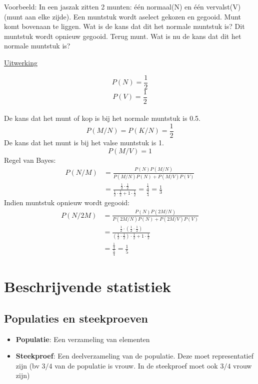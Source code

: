 \documentclass[12pt]{report}
\newcommand{\example}[2]{
      \hrulefill
      
      Voorbeeld: #1
      
      \underline{Uitwerking}
      
      #2
      
      \hrulefill
  }
\begin{document}
\example{In een jaszak zitten 2 munten: één normaal(N) en één vervalst(V) (munt aan elke zijde). Een muntstuk wordt aselect gekozen en gegooid. Munt komt bovenaan te liggen. Wat is de kans dat dit het normale muntstuk is? Dit muntstuk wordt opnieuw gegooid. Terug munt. Wat is nu de kans dat dit het normale muntstuk is?}{
	
	$$P(N) = \frac{1}{2}$$
	$$P(V) = \frac{1}{2}$$
	\\
	De kans dat het munt of kop is bij het normale muntstuk is 0.5.
	$$P(M/N) = P(K/N) = \frac{1}{2}$$
	De kans dat het munt is bij het valse muntstuk is 1.
	$$P(M/V) = 1$$
	Regel van Bayes:
	\begin{equation*}
	 \begin{split}
	  P(N/M) & = \frac{P(N)P(M/N)}{P(M/N)P(N) + P(M/V)P(V)}\\
	         & = \frac{\frac{1}{2} \cdot \frac{1}{2}}{\frac{1}{2} \cdot \frac{1}{2} + 1\cdot \frac{1}{2}}
	          = \frac{\frac{1}{4}}{\frac{3}{4}}
	          = \frac{1}{3}
	 \end{split}
	\end{equation*}
	Indien muntstuk opnieuw wordt gegooid:
	\begin{equation*}
	 \begin{split}
	   P(N/2M) & = \frac{P(N)P(2M/N)}{P(2M/N)P(N) + P(2M/V)P(V)}\\
	           & = \frac{\frac{1}{2} \cdot (\frac{1}{2} \cdot \frac{1}{2})}{(\frac{1}{2} \cdot \frac{1}{2}) \cdot \frac{1}{2} + 1\cdot \frac{1}{2}}\\
	           & = \frac{\frac{1}{4}}{\frac{5}{4}} = \frac{1}{5}
	 \end{split}
	\end{equation*}
}

\chapter{Beschrijvende statistiek}
\section{Populaties en steekproeven}
\begin{itemize}
	\item \textbf{Populatie}: Een verzameling van elementen 
	\item \textbf{Steekproef}: Een deelverzameling van de populatie. Deze moet representatief zijn (bv $3/4$ van de populatie is vrouw. In de steekproef moet ook $3/4$ vrouw zijn)
\end{itemize}
\end{document}
